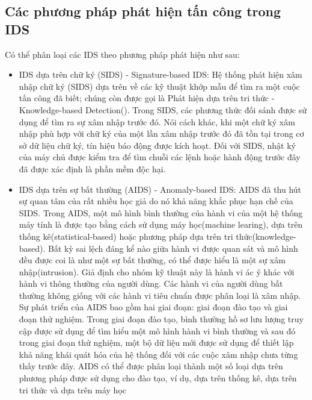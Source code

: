 \subsection{Các phương pháp phát hiện tấn công trong IDS}

Có thể phân loại các IDS theo phương pháp phát hiện như sau:
\begin{itemize}
    \item IDS dựa trên chữ ký (SIDS) - Signature-based IDS:
          Hệ thống phát hiện xâm nhập chữ ký (SIDS) dựa trên
          về các kỹ thuật khớp mẫu để tìm ra một cuộc tấn công đã biết;
          chúng còn được gọi là Phát hiện dựa trên tri thức - Knowledge-based Detection(\cite{sids}).
          Trong SIDS, các phương thức đối sánh được sử dụng để tìm ra sự xâm nhập trước đó.
          Nói cách khác, khi một chữ ký xâm nhập phù hợp với
          chữ ký của một lần xâm nhập trước đó đã tồn tại
          trong cơ sở dữ liệu chữ ký, tín hiệu báo động được kích hoạt.
          Đối với SIDS, nhật ký của máy chủ được kiểm tra để tìm chuỗi
          các lệnh hoặc hành động trước đây đã được xác định là phần mềm độc hại.

    \item IDS dựa trên sự bất thường (AIDS) - Anomaly-based IDS:
          AIDS đã thu hút sự quan tâm của rất nhiều học giả do nó
          khả năng khắc phục hạn chế của SIDS. Trong AIDS, một
          mô hình bình thường của hành vi của một hệ thống máy tính là
          được tạo bằng cách sử dụng máy học(machine learing), dựa trên thống kê(statistical-based) hoặc
          phương pháp dựa trên tri thức(knowledge-based). Bất kỳ sai lệch đáng kể nào giữa hành vi được quan sát và mô hình đều được coi là
          như một sự bất thường, có thể được hiểu là một sự xâm nhập(intrusion).
          Giả định cho nhóm kỹ thuật này là hành vi ác ý khác với hành vi thông thường của người dùng. Các
          hành vi của người dùng bất thường không giống với
          các hành vi tiêu chuẩn được phân loại là xâm nhập. Sự phát triển của AIDS bao gồm hai giai đoạn: giai đoạn đào tạo
          và giai đoạn thử nghiệm. Trong giai đoạn đào tạo, bình thường
          hồ sơ lưu lượng truy cập được sử dụng để tìm hiểu một mô hình hành vi bình thường và sau đó trong giai đoạn thử nghiệm, một bộ dữ liệu mới được sử dụng
          để thiết lập khả năng khái quát hóa của hệ thống đối với các cuộc xâm nhập chưa từng thấy trước đây. AIDS có thể được phân loại thành một
          số loại dựa trên phương pháp được sử dụng cho
          đào tạo, ví dụ, dựa trên thống kê, dựa trên tri thức
          và dựa trên máy học\cite{aids}

\end{itemize}


